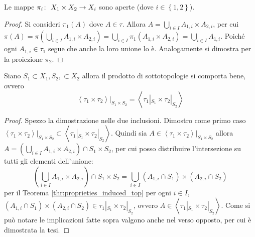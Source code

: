 \begin{theorem}
	Le mappe $\pi_i \colon\ X_1\times X_2 \rightarrow X_i$ sono aperte (dove $i \in \left\{1,2\right\}$). 
\end{theorem}
\begin{proof}
	Si consideri $\pi_1(A)$ dove $A \in \tau$. Allora $A = \bigcup_{i \in I} A_{1,i} \times A_{2,i}$, per cui $\pi(A) = \pi(\bigcup_{i \in I} A_{1,i} \times A_{2,i}) = \bigcup_{i\in I} \pi_1 (A_{1,i} \times A_{2,i}) = \bigcup_{i \in I} A_{1,i}$. Poiché ogni $A_{1,i} \in \tau_1$ segue che anche la loro unione lo è. Analogamente si dimostra per la proiezione $\pi_2$.
\end{proof}

\begin{theorem}
	Siano $S_1 \subset X_1, S_2, \subset X_2$ allora il prodotto di sottotopologie si comporta bene, ovvero
	\begin{equation*}
		\left\langle \tau_1 \times \tau_2 \right\rangle|_{S_1 \times S_2} = \left\langle \tau_1|_{S_1} \times \tau_2|_{S_2} \right\rangle 
	\end{equation*}
\end{theorem}
\begin{proof}
	Spezzo la dimostrazione nelle due inclusioni. Dimostro come primo caso $	\left\langle \tau_1 \times \tau_2 \right\rangle|_{S_1 \times S_2} \subset \left\langle \tau_1|_{S_1} \times \tau_2|_{S_2} \right\rangle$. Quindi sia $A \in \left\langle \tau_1 \times \tau_2 \right\rangle|_{S_1 \times S_2}$ allora $A = \left( \bigcup_{i \in I} A_{1,i} \times A_{2,i} \right) \cap S_1 \times S_2$, per cui posso distribuire l'intersezione su tutti gli elementi dell'unione:
	\begin{equation*}
		\left( \bigcup_{i \in I} A_{1,i} \times A_{2,i} \right) \cap S_1 \times S_2 = \bigcup_{i \in I} (A_{1,i} \cap S_1) \times (A_{2,i} \cap S_2)
	\end{equation*}
	per il Teorema \ref{thr:proprieties_induced_top} per ogni $i \in I$, $(A_{1,i} \cap S_1) \times (A_{2,i} \cap S_2) \in \tau_1|_{S_1} \times \tau_2|_{S_2}$, ovvero $A \in \left\langle \tau_1|_{S_1} \times \tau_2|_{S_2} \right\rangle$. Come si può notare le implicazioni fatte sopra valgono anche nel verso opposto, per cui è dimostrata la tesi.
\end{proof}

